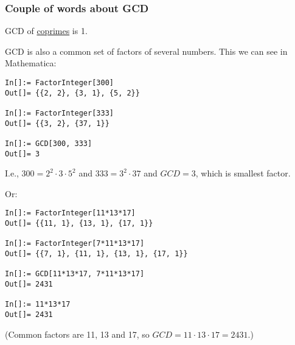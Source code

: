 \subsubsection{Couple of words about GCD}

GCD of \href{https://yurichev.com/blog/RSA/}{coprimes} is 1.

\myhrule{}

GCD is also a common set of factors of several numbers.
This we can see in Mathematica:

\begin{lstlisting}
In[]:= FactorInteger[300]
Out[]= {{2, 2}, {3, 1}, {5, 2}}

In[]:= FactorInteger[333]
Out[]= {{3, 2}, {37, 1}}

In[]:= GCD[300, 333]
Out[]= 3
\end{lstlisting}

I.e., $300=2^2 \cdot 3 \cdot 5^2$ and $333=3^2 \cdot 37$ and $GCD=3$, which is smallest factor.

Or:

\begin{lstlisting}
In[]:= FactorInteger[11*13*17]
Out[]= {{11, 1}, {13, 1}, {17, 1}}

In[]:= FactorInteger[7*11*13*17]
Out[]= {{7, 1}, {11, 1}, {13, 1}, {17, 1}}

In[]:= GCD[11*13*17, 7*11*13*17]
Out[]= 2431

In[]:= 11*13*17
Out[]= 2431
\end{lstlisting}

(Common factors are 11, 13 and 17, so $GCD = 11 \cdot 13 \cdot 17 = 2431$.)

